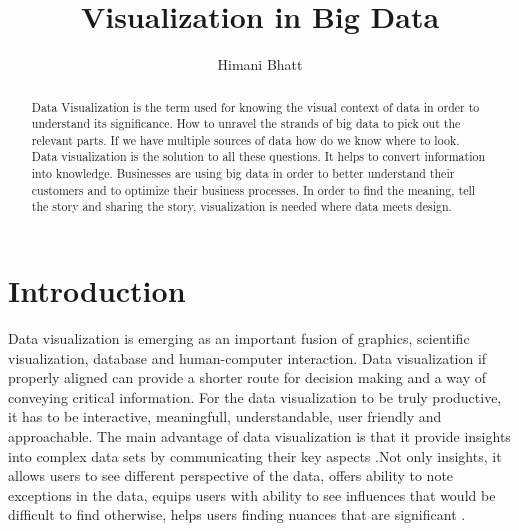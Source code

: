 

%



\title{Visualization in Big Data}


\author{Himani Bhatt}



\renewcommand{\shortauthors}{H. Bhatt}



\begin{abstract}
Data Visualization is the term used for knowing the visual context of data in order to understand its significance. How to unravel the strands of big data to pick out the relevant parts. If we have multiple sources of data how do we know where to look. Data visualization is the solution to all these questions. It helps to convert information into knowledge. Businesses are using big data in order to better understand their customers and to optimize their business processes. In order to find the meaning, tell the story and sharing the story, visualization is needed where data meets design.
\end{abstract}


\maketitle

\section{Introduction} 

Data visualization is emerging as an important fusion of graphics, scientific visualization, database and human-computer interaction. Data visualization if properly aligned can provide a shorter route for decision making and a way of conveying critical information. For the data visualization to be truly productive, it has to be interactive, meaningfull, understandable, user friendly and approachable. The main advantage of data visualization is that it provide insights into complex data sets by communicating their key aspects \cite{Intro01}.Not only insights, it allows users to see different perspective of the data, offers ability to note exceptions in the data, equips users with ability to see influences that would be difficult to find otherwise, helps users finding nuances that are significant \cite{Intro02}. \\

